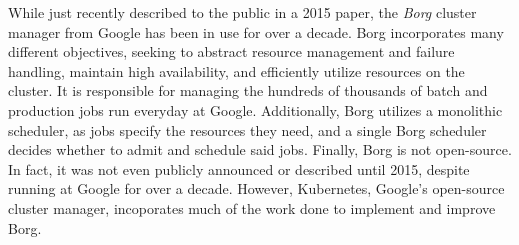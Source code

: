 While just recently described to the public in a 2015 paper, the
\textit{Borg} cluster manager from Google has been in use for over a
decade.\cite[pg. 14]{borg} Borg incorporates
many different objectives, seeking to abstract resource management and failure
handling, maintain high availability, and efficiently utilize resources on the
cluster.\cite[pg. 1]{borg} It is responsible for managing the hundreds of
thousands of batch and production jobs run everyday at Google. Additionally,
Borg utilizes a monolithic scheduler, as jobs specify the
resources they need, and a single Borg scheduler decides whether to admit and
schedule said jobs. Finally, Borg is not open-source. In fact, it was not even
publicly announced or described until 2015, despite running at Google for over a
decade. However, Kubernetes, Google's open-source cluster manager, incoporates
much of the work done to implement and improve Borg.
